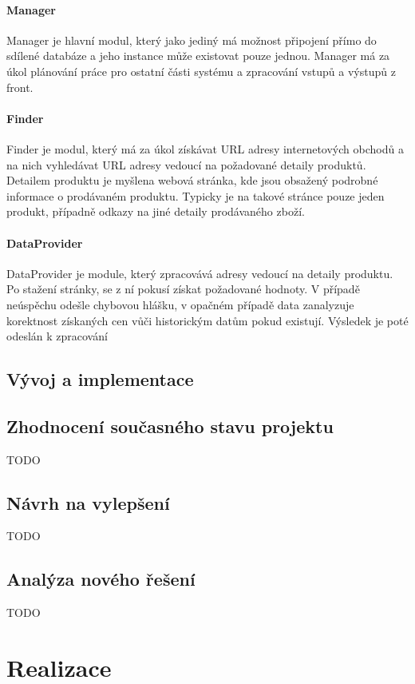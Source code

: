 \documentclass[thesis=B,czech]{FITthesis}[2012/06/26]
\begin{document}
\subsubsection{Manager}
Manager je hlavní modul, který jako jediný má možnost připojení přímo do sdílené databáze a jeho instance může existovat pouze jednou.
Manager má za úkol plánování práce pro ostatní části systému a zpracování vstupů a výstupů z front.
\subsubsection{Finder}
Finder je modul, který má za úkol získávat URL adresy internetových obchodů a na nich vyhledávat URL adresy vedoucí na požadované detaily produktů.
Detailem produktu je myšlena webová stránka, kde jsou obsažený podrobné informace o prodávaném produktu. Typicky je na takové stránce pouze jeden
produkt, případně odkazy na jiné detaily prodávaného zboží.
\subsubsection{DataProvider}
DataProvider je module, který zpracovává adresy vedoucí na detaily produktu. Po stažení stránky, se z ní pokusí získat požadované
hodnoty. V případě neúspěchu odešle chybovou hlášku, v opačném případě data zanalyzuje korektnost získaných cen vůči historickým datům pokud
existují. Výsledek je poté odeslán k zpracování  

\section{Vývoj a implementace}


\section{Zhodnocení současného stavu projektu}
TODO
\section{Návrh na vylepšení}
TODO
\section{Analýza nového řešení}
TODO


\chapter{Realizace}
\end{document}
